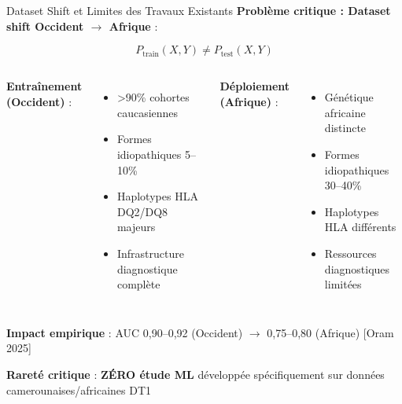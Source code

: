 \documentclass[11pt, aspectratio=169]{beamer}
\begin{document}
\begin{frame}{Dataset Shift et Limites des Travaux Existants}
  \textbf{Problème critique : Dataset shift Occident $\rightarrow$ Afrique} :
  
  \vspace{0.6em}
  
  \begin{equation*}
    \boxed{P_{\text{train}}(X, Y) \neq P_{\text{test}}(X, Y)}
  \end{equation*}
  
  \vspace{0.6em}
  
  \begin{columns}[T]
    \textbf{\small Entraînement (Occident)} :
    \begin{itemize}
      \item >90\% cohortes caucasiennes
      \item Formes idiopathiques 5--10\%
      \item Haplotypes HLA DQ2/DQ8 majeurs
      \item Infrastructure diagnostique complète
    \end{itemize}
    
    \textbf{\small Déploiement (Afrique)} :
    \begin{itemize}
      \item Génétique africaine distincte
      \item Formes idiopathiques 30--40\%
      \item Haplotypes HLA différents
      \item Ressources diagnostiques limitées
    \end{itemize}
  \end{columns}
  
  \vspace{0.8em}
  
  \textbf{\textcolor{accent1}{Impact empirique}} : AUC 0,90--0,92 (Occident) $\rightarrow$ 0,75--0,80 (Afrique) [Oram 2025]
  
  \vspace{0.6em}
  
  \textbf{\textcolor{accent1}{Rareté critique}} : \textbf{ZÉRO étude ML} développée spécifiquement sur données camerounaises/africaines DT1
\end{frame}

\end{document}
